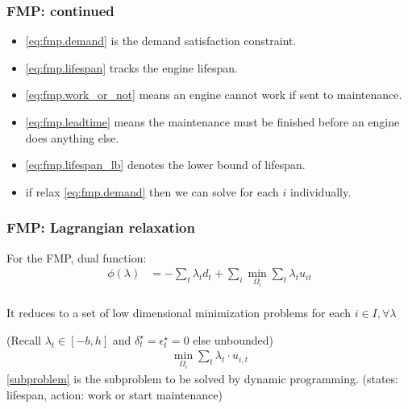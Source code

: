 \begin{frame}
  \frametitle{FMP: continued}
  \begin{itemize}
    \item \eqref{eq:fmp.demand} is the demand satisfaction constraint.
    \item \eqref{eq:fmp.lifespan} tracks the engine lifespan.
    \item \eqref{eq:fmp.work_or_not} means an engine cannot work if sent to maintenance.
    \item \eqref{eq:fmp.leadtime} means the maintenance must be finished before an engine does anything else.
    \item \eqref{eq:fmp.lifespan_lb} denotes the lower bound of lifespan.
    \item if relax \eqref{eq:fmp.demand} then we can solve for each \(i\) individually.
  \end{itemize}
\end{frame}

\begin{frame}
  \frametitle{FMP: Lagrangian relaxation}
  For the FMP, dual function:
  \[\begin{aligned}
      \phi(\lambda) & = - \sum_t \lambda_t d_t + \sum_i \min_{\Omega_i} \sum_t\lambda_t u_{it} \\
    \end{aligned}\]

  It reduces to a set of low dimensional minimization problems for each \(i \in I, \forall \lambda\)

  (Recall \(\lambda_t \in [-b, h] \) and \(\delta_t^\star = \epsilon_t^\star = 0\) else unbounded)
  \begin{equation}\label{subproblem}\begin{aligned}
      \min_{\Omega_i} \sum_t \lambda_t \cdot u_{i,t}
    \end{aligned}\end{equation}
  \eqref{subproblem} is the subproblem to be solved by dynamic programming. (states: lifespan, action: work or start maintenance)
\end{frame}

